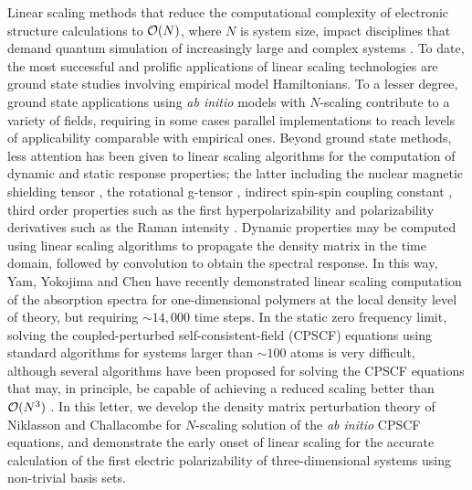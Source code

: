 \documentclass[prl,aps,twocolumn,showpacs,twocolumngrid,superbib]{revtex4}
\begin{document}
Linear scaling methods that reduce the computational complexity of 
electronic structure calculations to ${\cal O}(N)$, where $N$ is system size, 
impact disciplines that demand quantum simulation of increasingly large and complex systems
\cite{GGalli96,DBowler97,SGoedecker99,POrdejon00,VGogonea01,SWu02}. 
To date, the most successful and prolific applications of linear scaling technologies are
ground state studies involving empirical model Hamiltonians.  
To a lesser degree, ground state applications using {\em ab initio} models 
with $N$-scaling contribute to a variety of fields, requiring in some
cases parallel implementations to reach levels of applicability comparable with empirical ones. 
Beyond ground state methods, less attention has been given 
to linear scaling algorithms for the computation of dynamic and static response 
properties; the latter including the nuclear magnetic shielding tensor \cite{Pulay_1990}, 
the rotational g-tensor \cite{Helgaker_1996}, indirect spin-spin coupling constant 
\cite{Pennington_1991,Malkin_1996}, third order  properties such as the first hyperpolarizability 
\cite{Franky_1997} and polarizability derivatives such as the Raman intensity 
\cite{Lazzeri_2003,Champagne_2001}.  Dynamic  properties may be computed using 
linear scaling algorithms to propagate the density matrix \cite{SNomura97,CYam03} in 
the time domain, followed by convolution to obtain the spectral response.  In this way, 
Yam, Yokojima and Chen \cite{CYam03} have recently demonstrated linear scaling 
computation of the absorption spectra for one-dimensional polymers at the local 
density level of theory, but requiring $\sim 14,000$ time steps.  
In the static zero frequency limit, solving the coupled-perturbed self-consistent-field 
(CPSCF) equations using standard algorithms for systems larger than $\sim 100$ atoms 
is very difficult, although several algorithms have been proposed for solving the CPSCF equations 
that may, in principle, be capable of achieving a reduced scaling better than ${\cal O}(N^3)$ 
\cite{COchsenfeld97,HLarsen01a}.  In this letter, we develop 
the density matrix perturbation theory of Niklasson and Challacombe 
\cite{ANiklasson03} for $N$-scaling solution of the {\em ab initio} CPSCF equations, and 
demonstrate the early onset of linear scaling for the accurate calculation of the first electric 
polarizability of three-dimensional systems using non-trivial basis sets.
\end{document}
